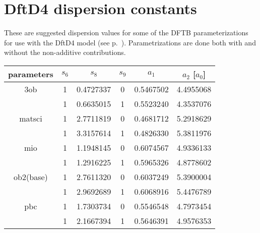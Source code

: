 
\chapter{DftD4 dispersion constants}
\label{app:dftd4const}

These are suggested dispersion values for some of the DFTB parameterizations for
use with the DftD4 model (see p.~).  Parametrizations are
done both with and without the non-additive contributions.

\begin{table}[ht]
  \begin{tabular}{|c|ccccc|}
    \hline
    parameters & $s_6$ & $s_8$ & $s_9$ & $a_1$ & $a_2$ [$a_0$] \\
    \hline
    3ob
               & 1 & 0.4727337 & 0 & 0.5467502 & 4.4955068 \\
               & 1 & 0.6635015 & 1 & 0.5523240 & 4.3537076 \\
    matsci
               & 1 & 2.7711819 & 0 & 0.4681712 & 5.2918629 \\
               & 1 & 3.3157614 & 1 & 0.4826330 & 5.3811976 \\
    mio
               & 1 & 1.1948145 & 0 & 0.6074567 & 4.9336133 \\
               & 1 & 1.2916225 & 1 & 0.5965326 & 4.8778602 \\
    ob2(base)
               & 1 & 2.7611320 & 0 & 0.6037249 & 5.3900004 \\
               & 1 & 2.9692689 & 1 & 0.6068916 & 5.4476789 \\
    pbc
               & 1 & 1.7303734 & 0 & 0.5546548 & 4.7973454 \\
               & 1 & 2.1667394 & 1 & 0.5646391 & 4.9576353 \\
    \hline
  \end{tabular}
\end{table}
